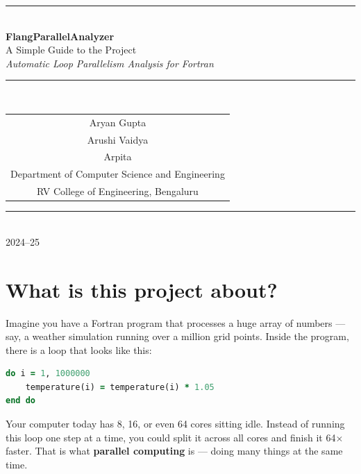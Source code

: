 \documentclass[12pt,a4paper]{article}
\begin{document}
\begin{titlepage}
\centering
\vspace*{1.5cm}
{\color{navyblue}\rule{\linewidth}{3pt}}\\[1.2cm]
{\Huge\bfseries\color{navyblue} FlangParallelAnalyzer}\\[0.6cm]
{\Large\color{darkgray} A Simple Guide to the Project}\\[0.4cm]
{\large\color{darkgray}\textit{Automatic Loop Parallelism Analysis for Fortran}}\\[1.5cm]
{\color{navyblue}\rule{\linewidth}{1pt}}\\[1.5cm]

\begin{tabular}{c}
{\large Aryan Gupta} \\[4pt]
{\large Arushi Vaidya} \\[4pt]
{\large Arpita} \\[12pt]
{\normalsize Department of Computer Science and Engineering} \\[4pt]
{\normalsize RV College of Engineering, Bengaluru} \\
\end{tabular}

\vfill
{\color{navyblue}\rule{\linewidth}{3pt}}\\[0.5cm]
{\normalsize 2024--25}
\end{titlepage}

\tableofcontents
\newpage

\section{What is this project about?}

Imagine you have a Fortran program that processes a huge array of
numbers --- say, a weather simulation running over a million grid
points. Inside the program, there is a loop that looks like this:

\begin{lstlisting}[language=Fortran]
do i = 1, 1000000
    temperature(i) = temperature(i) * 1.05
end do
\end{lstlisting}

Your computer today has 8, 16, or even 64 cores sitting idle. Instead
of running this loop one step at a time, you could split it across all
cores and finish it 64$\times$ faster. That is what \textbf{parallel
computing} is --- doing many things at the same time.
\end{document}
